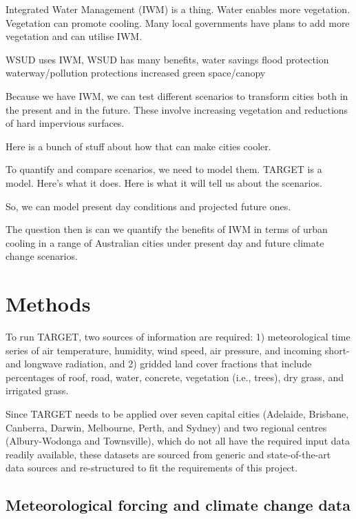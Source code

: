 \documentclass[utf8]{frontiersSCNS} %
\begin{document}
Integrated Water Management (IWM) is a thing. Water enables more vegetation. Vegetation can promote cooling. Many local governments have plans to add more vegetation and can utilise IWM.

WSUD uses IWM,
WSUD has many benefits, 
water savings
flood protection
waterway/pollution protections
increased green space/canopy
 


Because we have IWM, we can test different scenarios to transform cities both in the present and in the future. These involve increasing vegetation and reductions of hard impervious surfaces. 

Here is a bunch of stuff about how that can make cities cooler.

To quantify and compare scenarios, we need to model them. TARGET \citep{Broadbent2019} is a model. Here's what it does. Here is what it will tell us about the scenarios.

So, we can model present day conditions and projected future ones. 

The question then is can we quantify the benefits of IWM in terms of urban cooling in a range of Australian cities under present day and future climate change scenarios.






\section{Methods}\label{sec:methods}


To run TARGET, two sources of information are required: 1) meteorological time series of air temperature, humidity, wind speed, air pressure, and incoming short- and longwave radiation, and 2) gridded land cover fractions that include percentages of roof, road, water, concrete, vegetation (i.e., trees), dry grass, and irrigated grass. 

Since TARGET needs to be applied over seven capital cities (Adelaide, Brisbane, Canberra, Darwin, Melbourne, Perth, and Sydney) and two regional centres (Albury-Wodonga and Townsville), which do not all have the required input data readily available, these datasets are sourced from generic and state-of-the-art data sources and re-structured to fit the requirements of this project. 

\subsection{Meteorological forcing and climate change data}\label{sec:forcing}
\end{document}
